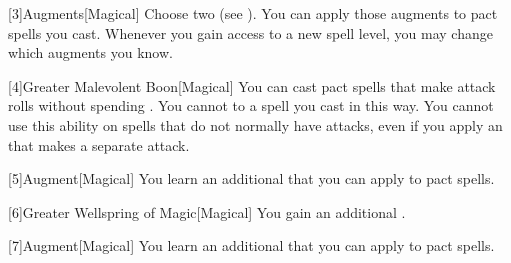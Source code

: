         [3]{Augments}[Magical]
        Choose two  (see ).
        You can apply those augments to pact spells you cast.
        Whenever you gain access to a new spell level, you may change which augments you know.

        [4]{Greater Malevolent Boon}[Magical] You can cast pact spells that make attack rolls without spending .
        You cannot  to a spell you cast in this way.
        You cannot use this ability on spells that do not normally have attacks, even if you apply an  that makes a separate attack.

        [5]{Augment}[Magical]
        You learn an additional  that you can apply to pact spells.

        [6]{Greater Wellspring of Magic}[Magical] You gain an additional .

        [7]{Augment}[Magical]
        You learn an additional  that you can apply to pact spells.
